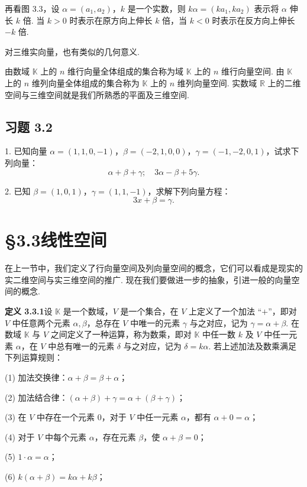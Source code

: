 \documentclass[UTF8, 12pt, fontset=fandol, oneside]{ctexart}
\begin{document}
再看图 3.3，设 $\alpha=(a_1,a_2)$，$k$ 是一个实数，则 $k\alpha=(ka_1,ka_2)$ 表示将 $\alpha$ 伸长 $k$ 倍. 当 $k>0$ 时表示在原方向上伸长 $k$ 倍，当 $k<0$ 时表示在反方向上伸长 $-k$ 倍.

对三维实向量，也有类似的几何意义.

由数域 $\mathbb{K}$ 上的 $n$ 维行向量全体组成的集合称为域 $\mathbb{K}$ 上的 $n$ 维行向量空间. 由 $\mathbb{K}$ 上的 $n$ 维列向量全体组成的集合称为 $\mathbb{K}$ 上的 $n$ 维列向量空间. 实数域 $\mathbb{R}$ 上的二维空间与三维空间就是我们所熟悉的平面及三维空间.

\subsection*{习题 3.2}

1. 已知向量 $\alpha=(1,1,0,-1)$，$\beta=(-2,1,0,0)$，$\gamma=(-1,-2,0,1)$，试求下列向量：
\[
\alpha+\beta+\gamma;\quad 3\alpha-\beta+5\gamma.
\]

2. 已知 $\beta=(1,0,1)$，$\gamma=(1,1,-1)$，求解下列向量方程：
\[
3x+\beta=\gamma.
\]

\section*{§3.3\quad 线性空间}

在上一节中，我们定义了行向量空间及列向量空间的概念，它们可以看成是现实的实二维空间与实三维空间的推广. 现在我们要做进一步的抽象，引进一般的向量空间的概念.

\noindent\textbf{定义 3.3.1}\quad 设 $\mathbb{K}$ 是一个数域，$V$ 是一个集合，在 $V$ 上定义了一个加法 ``$+$''，即对 $V$ 中任意两个元素 $\alpha,\beta$，总存在 $V$ 中唯一的元素 $\gamma$ 与之对应，记为 $\gamma=\alpha+\beta$. 在数域 $\mathbb{K}$ 与 $V$ 之间定义了一种运算，称为数乘，即对 $\mathbb{K}$ 中任一数 $k$ 及 $V$ 中任一元素 $\alpha$，在 $V$ 中总有唯一的元素 $\delta$ 与之对应，记为 $\delta=k\alpha$. 若上述加法及数乘满足下列运算规则：

(1) 加法交换律：$\alpha+\beta=\beta+\alpha$；

(2) 加法结合律：$(\alpha+\beta)+\gamma=\alpha+(\beta+\gamma)$；

(3) 在 $V$ 中存在一个元素 $0$，对于 $V$ 中任一元素 $\alpha$，都有 $\alpha+0=\alpha$；

(4) 对于 $V$ 中每个元素 $\alpha$，存在元素 $\beta$，使 $\alpha+\beta=0$；

(5) $1\cdot\alpha=\alpha$；

(6) $k(\alpha+\beta)=k\alpha+k\beta$；
\end{document}
